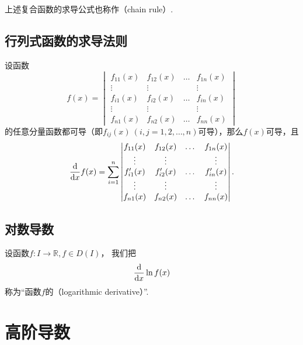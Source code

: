 上述复合函数的求导公式也称作（chain rule）.

\subsection{行列式函数的求导法则}
\begin{theorem}
\def\f#1{f_{#1}(x)}%
\def\g#1{f_{#1}'(x)}%
设函数\[
f(x) = \begin{vmatrix}
\f{11} & \f{12} & \dots & \f{1n} \\
\vdots & \vdots & & \vdots \\
\f{i1} & \f{i2} & \dots & \f{in} \\
\vdots & \vdots & & \vdots \\
\f{n1} & \f{n2} & \dots & \f{nn}
\end{vmatrix}
\]的任意分量函数都可导（即\(\f{ij}\ (i,j=1,2,\dotsc,n)\)可导），那么\(f(x)\)可导，且\[
\dv{x} f(x) = \sum\limits_{i=1}^n \begin{vmatrix}
\f{11} & \f{12} & \dots & \f{1n} \\
\vdots & \vdots & & \vdots \\
\g{i1} & \g{i2} & \dots & \g{in} \\
\vdots & \vdots & & \vdots \\
\f{n1} & \f{n2} & \dots & \f{nn}
\end{vmatrix}.
\]
\end{theorem}

\subsection{对数导数}
\begin{definition}
设函数\(f\colon I \to \mathbb{R}, f \in D(I)\)，
我们把\[
	\dv{x} \ln f(x)
\]称为“函数\(f\)的（logarithmic derivative）”.
\end{definition}

\section{高阶导数}
